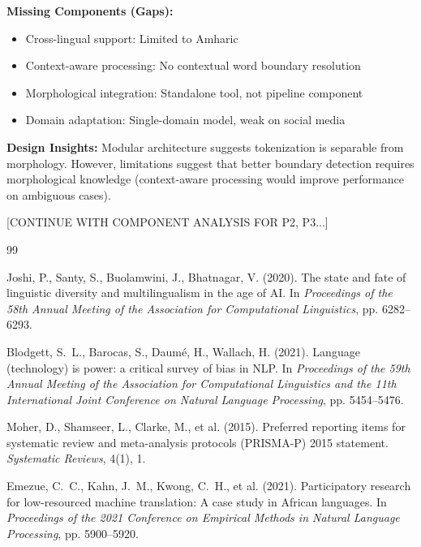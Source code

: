 \documentclass[12pt,a4paper]{article}
\theoremstyle{plain}
\theoremstyle{definition}
\begin{document}
\textbf{Missing Components (Gaps):}
\begin{itemize}
\item Cross-lingual support: Limited to Amharic
\item Context-aware processing: No contextual word boundary resolution
\item Morphological integration: Standalone tool, not pipeline component
\item Domain adaptation: Single-domain model, weak on social media
\end{itemize}

\textbf{Design Insights:} Modular architecture suggests tokenization is separable from morphology. However, limitations suggest that better boundary detection requires morphological knowledge (context-aware processing would improve performance on ambiguous cases).

[CONTINUE WITH COMPONENT ANALYSIS FOR P2, P3...]


\begin{thebibliography}{99}

 Joshi, P., Santy, S., Buolamwini, J., Bhatnagar, V. (2020). The state and fate of linguistic diversity and multilingualism in the age of AI. In \emph{Proceedings of the 58th Annual Meeting of the Association for Computational Linguistics}, pp. 6282--6293.

 Blodgett, S.~L., Barocas, S., Daumé, H., Wallach, H. (2021). Language (technology) is power: a critical survey of bias in NLP. In \emph{Proceedings of the 59th Annual Meeting of the Association for Computational Linguistics and the 11th International Joint Conference on Natural Language Processing}, pp. 5454--5476.

 Moher, D., Shamseer, L., Clarke, M., et al. (2015). Preferred reporting items for systematic review and meta-analysis protocols (PRISMA-P) 2015 statement. \emph{Systematic Reviews}, 4(1), 1.

 Emezue, C.~C., Kahn, J.~M., Kwong, C.~H., et al. (2021). Participatory research for low-resourced machine translation: A case study in African languages. In \emph{Proceedings of the 2021 Conference on Empirical Methods in Natural Language Processing}, pp. 5900--5920.

\end{thebibliography}
\end{document}
